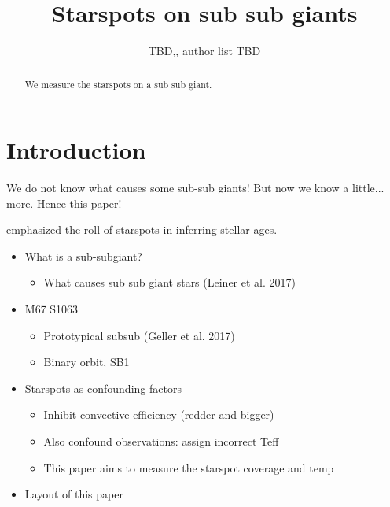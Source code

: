 \documentclass[twocolumn]{emulateapj}%
\begin{document}
\title{Starspots on sub sub giants }

\author{TBD,, author list TBD}



\begin{abstract}

We measure the starspots on a sub sub giant.

\end{abstract}


\maketitle

\section{Introduction}\label{sec:intro}

We do not know what causes some sub-sub giants!
But now we know a little... more. Hence this paper!

\citet{somers15} emphasized the roll of starspots in inferring stellar ages.

\begin{itemize}
\item What is a sub-subgiant?
  \begin{itemize}
  \item What causes sub sub giant stars (Leiner et al. 2017)
  \end{itemize}
\item M67 S1063
\begin{itemize}
  \item Prototypical subsub (Geller et al. 2017)
  \item Binary orbit, SB1
\end{itemize}
\item Starspots as confounding factors
\begin{itemize}
  \item Inhibit convective efficiency (redder and bigger)
  \item Also confound observations: assign incorrect Teff
  \item This paper aims to measure the starspot coverage and temp
\end{itemize}
\item Layout of this paper
\end{itemize}
\end{document}
